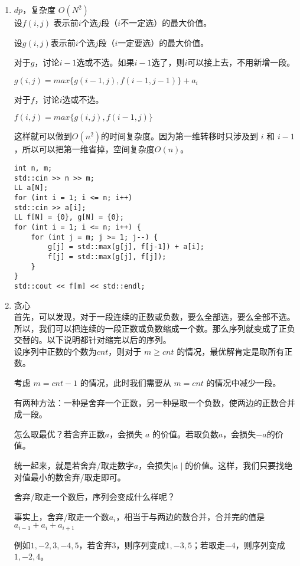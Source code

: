 \documentclass[E:/GsjzTle/main/main.tex]{subfiles}
\begin{document}
\begin{enumerate}
\def\labelenumi{\arabic{enumi}.}
\item
  \(dp\)，复杂度 \(O(N^2)\)\\
  设\(f(i,j)\) 表示前\(i\)个选\(j\)段（\(i\)不一定选）的最大价值。

  设\(g(i,j)\)表示前\(i\)个选\(j\)段（\(i\)一定要选）的最大价值。

  对于\(g\)，讨论\(i-1\)选或不选。如果\(i-1\)选了，则\(i\)可以接上去，不用新增一段。

  \(g(i,j)=max\{g(i-1,j),f(i-1,j-1)\}+a_i\)

  对于\(f\)，讨论\(i\)选或不选。

  \(f(i,j)=max\{g(i,j),f(i-1,j)\}\)

  这样就可以做到\(O(n^2)\)的时间复杂度。因为第一维转移时只涉及到 \(i\)
  和 \(i-1\)，所以可以把第一维省掉，空间复杂度\(O(n)\)。

\begin{lstlisting}
int n, m;
std::cin >> n >> m;
LL a[N];
for (int i = 1; i <= n; i++)
std::cin >> a[i];   
LL f[N] = {0}, g[N] = {0};
for (int i = 1; i <= n; i++) {
	for (int j = m; j >= 1; j--) {
		g[j] = std::max(g[j], f[j-1]) + a[i];
		f[j] = std::max(g[j], f[j]);
	}
}
std::cout << f[m] << std::endl;
\end{lstlisting}
\item
  贪心\\
  首先，可以发现，对于一段连续的正数或负数，要么全部选，要么全部不选。\\
  所以，我们可以把连续的一段正数或负数缩成一个数。那么序列就变成了正负交替的。以下说明都针对缩完以后的序列。\\
  设序列中正数的个数为\(cnt\)，则对于 \(m\ge cnt\)
  的情况，最优解肯定是取所有正数。

  考虑 \(m=cnt-1\) 的情况，此时我们需要从 \(m=cnt\) 的情况中减少一段。

  有两种方法：一种是舍弃一个正数，另一种是取一个负数，使两边的正数合并成一段。

  怎么取最优？若舍弃正数\(a\)，会损失 \(a\)
  的价值。若取负数\(a\)，会损失\(-a\)的价值。

  统一起来，就是若舍弃/取走数字\(a\)，会损失\(\mid a\mid\)的价值。这样，我们只要找绝对值最小的数舍弃/取走即可。

  舍弃/取走一个数后，序列会变成什么样呢？

  事实上，舍弃/取走一个数\(a_i\)，相当于与两边的数合并，合并完的值是\(a_{i-1}+a_i+a_{i+1}\)

  例如\(1,-2,3,-4,5\)，若舍弃\(3\)，则序列变成\(1,-3,5\)；若取走\(-4\)，则序列变成\(1,-2,4\)。


\end{enumerate}
\end{document}
